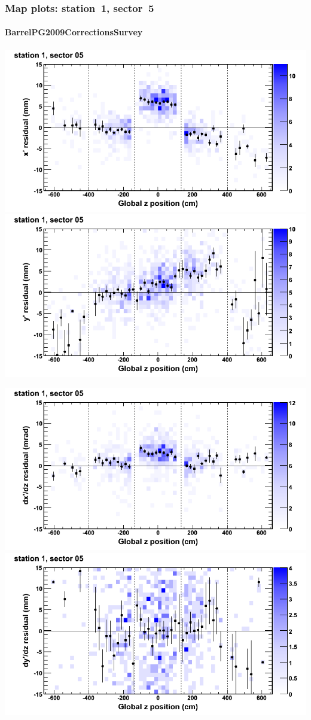 \documentclass[compress]{beamer}
\begin{document}
\begin{frame}
\frametitle{Map plots: station~1, sector~5}
\framesubtitle{BarrelPG2009CorrectionsSurvey}
\includegraphics[width=0.5\linewidth]{mapplots_01/DTvsz_st1sec05_x.png}
\includegraphics[width=0.5\linewidth]{mapplots_01/DTvsz_st1sec05_y.png}

\includegraphics[width=0.5\linewidth]{mapplots_01/DTvsz_st1sec05_dxdz.png}
\includegraphics[width=0.5\linewidth]{mapplots_01/DTvsz_st1sec05_dydz.png}
\end{frame}
\end{document}
